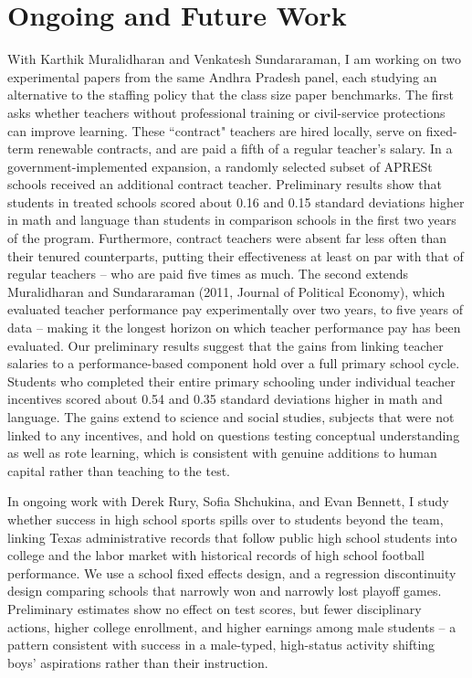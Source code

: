 \documentclass[letter,10pt]{article}
\begin{document}
\section*{Ongoing and Future Work}
With Karthik Muralidharan and  Venkatesh Sundararaman, I am working on two experimental papers from the same Andhra Pradesh panel, each studying an alternative to the staffing policy that the class size paper benchmarks. The first asks whether teachers without professional training or civil-service protections can improve learning. These ``contract" teachers are hired locally, serve on fixed-term renewable contracts, and are paid a fifth of a regular teacher's salary. In a government-implemented expansion, a randomly selected subset of APRESt schools received an additional contract teacher. Preliminary results show that students in treated schools scored about 0.16 and 0.15 standard deviations higher in math and language than students in comparison schools in the first two years of the program. Furthermore, contract teachers were absent far less often than their tenured counterparts, putting their effectiveness at least on par with that of regular teachers -- who are paid five times as much. The second extends Muralidharan and Sundararaman (2011, Journal of Political Economy), which evaluated teacher performance pay experimentally over two years, to five years of data -- making it the longest horizon on which teacher performance pay has been evaluated. Our preliminary results suggest that the gains from linking teacher salaries to a performance-based component hold over a full primary school cycle. Students who completed their entire primary schooling under individual teacher incentives scored about 0.54 and 0.35 standard deviations higher in math and language. The gains extend to science and social studies, subjects that were not linked to any incentives, and hold on questions testing conceptual understanding as well as rote learning, which is consistent with genuine additions to human capital rather than teaching to the test. 

In ongoing work with Derek Rury, Sofia Shchukina, and Evan Bennett, I study whether success in high school sports spills over to students beyond the team, linking Texas administrative records that follow public high school students into college and the labor market with historical records of high school football performance. We use a school fixed effects design, and a regression discontinuity design comparing schools that narrowly won and narrowly lost playoff games. Preliminary estimates show no effect on test scores, but fewer disciplinary actions, higher college enrollment, and higher earnings among male students -- a pattern consistent with success in a male-typed, high-status activity shifting boys' aspirations rather than their instruction.
\end{document}
